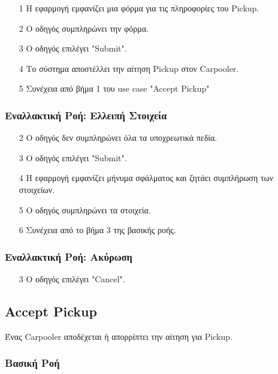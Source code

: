\begin{enumerate}
    \item[1] Η εφαρμογή εμφανίζει μια φόρμα για τις πληροφορίες του Pickup.
    \item[2] Ο οδηγός συμπληρώνει την φόρμα.
    \item[3] Ο οδηγός επιλέγει "Submit".
    \item[4] Το σύστημα αποστέλλει την αίτηση Pickup στον Carpooler.
    \item[5] Συνέχεια από βήμα 1 του use case "Accept Pickup"
\end{enumerate}

\subsubsection{Εναλλακτική Ροή: Ελλειπή Στοιχεία}

\begin{enumerate}
    \item[2] Ο οδηγός δεν συμπληρώνει όλα τα υποχρεωτικά πεδία.
    \item[3] Ο οδηγός επιλέγει "Submit".
    \item[4] Η εφαρμογή εμφανίζει μήνυμα σφάλματος και ζητάει συμπλήρωση των στοιχείων.
    \item[5] Ο οδηγός συμπληρώνει τα στοιχεία.
    \item[6] Συνέχεια από το βήμα 3 της βασικής ροής.
\end{enumerate}

\subsubsection{Εναλλακτική Ροή: Ακύρωση}

\begin{enumerate}
    \item[3] Ο οδηγός επιλέγει "Cancel".
\end{enumerate}

\subsection{Accept Pickup}
\label{uc:accept-pickup}

Ένας Carpooler αποδέχεται ή απορρίπτει την αίτηση για Pickup.

\subsubsection{Βασική Ροή}

